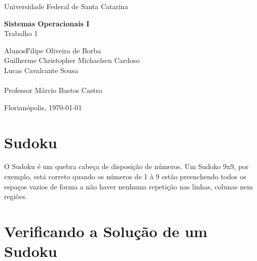 \documentclass[a4paper, 12pt]{article}
\begin{document}
\begin{titlepage}
    \begin{center}
        \huge{Universidade Federal de Santa Catarina}

        \vspace{10pt}

        \vspace{85pt}

        \textbf{\LARGE{Sistemas Operacionais I}}
        \large{\\Trabalho 1}
        \vspace{160pt}

    \end{center}

    \begin{flushleft}
        \begin{tabbing}
            Alunos\qquad\qquad\=
            Filipe Oliveira de Borba\\
            \>Guilherme Christopher Michaelsen Cardoso\\
            \>Lucas Cavalcante Sousa\\\\
            Professor\> Márcio Bastos Castro \\
        \end{tabbing}
    \end{flushleft}

    \begin{center}
        \vspace{\fill}
        Florianópolis, \today
    \end{center}
\end{titlepage}


\newpage
\tableofcontents
\thispagestyle{empty}


\newpage
{}

\section{Sudoku}
O Sudoku é um quebra cabeça de disposição de números. Um Sudoko 9x9, por exemplo,
está correto quando os números de 1 à 9 estão preenchendo todos os espaços vazios
de forma a não haver nenhuma repetição nas linhas, colunas nem regiões.

\section{Verificando a Solução de um Sudoku}
\end{document}
